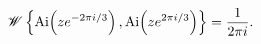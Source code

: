 \[\mathop{\mathscr{W}\/}\nolimits\left\{\mathop{\mathrm{Ai}\/}\nolimits\!\left(%
ze^{-2\pi i/3}\right),\mathop{\mathrm{Ai}\/}\nolimits\!\left(ze^{2\pi i/3}%
\right)\right\}=\frac{1}{2\pi i}.\]